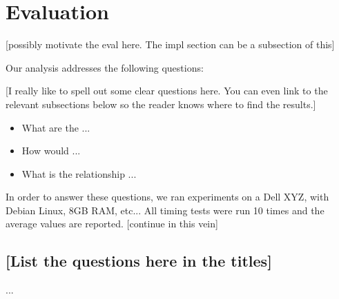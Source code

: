 \section{Evaluation}
\label{SEC:evaluation}

[possibly motivate the eval here.  The impl section can be a subsection of 
this]

Our analysis addresses the following questions:

[I really like to spell out some clear questions here.  You can even link
to the relevant subsections below so the reader knows where to find the 
results.]

\begin{itemize}

    \item What are the ...

    \item How would ...

    \item What is the relationship ...

\end{itemize}

In order to answer these questions, we ran experiments on a Dell XYZ, with
Debian Linux, 8GB RAM, etc...   All timing tests were run 10 times and the
average values are reported.  [continue in this vein]

\subsection{[List the questions here in the titles]}

...

